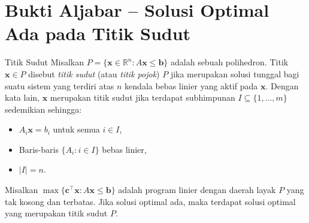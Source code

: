 \section{Bukti Aljabar -- Solusi Optimal Ada pada Titik Sudut}\label{sec:algebraic-vertex-proof}

\begin{definition}{Titik Sudut}{}
Misalkan \( P = \{ \mathbf{x} \in \mathbb{R}^n : A \mathbf{x} \leq \mathbf{b} \} \) adalah sebuah polihedron.  
Titik \( \mathbf{x} \in P \) disebut \emph{titik sudut} (atau \emph{titik pojok}) \( P \) jika merupakan solusi tunggal bagi suatu sistem yang terdiri atas \( n \) kendala bebas linier yang aktif pada \( \mathbf{x} \).  
Dengan kata lain, \( \mathbf{x} \) merupakan titik sudut jika terdapat subhimpunan \( I \subseteq \{1, \dots, m\} \) sedemikian sehingga:
\begin{itemize}
  \item \( A_i \mathbf{x} = b_i \) untuk semua \( i \in I \),
  \item Baris-baris \( \{ A_i : i \in I \} \) bebas linier,
  \item \( |I| = n \).
\end{itemize}
\end{definition}

\begin{theorem}{}{}
Misalkan \( \max \{ \mathbf{c}^\top \mathbf{x} : A \mathbf{x} \leq \mathbf{b} \} \) adalah program linier dengan daerah layak \( P \) yang tak kosong dan terbatas.  
Jika solusi optimal ada, maka terdapat solusi optimal yang merupakan titik sudut \( P \).
\end{theorem}

